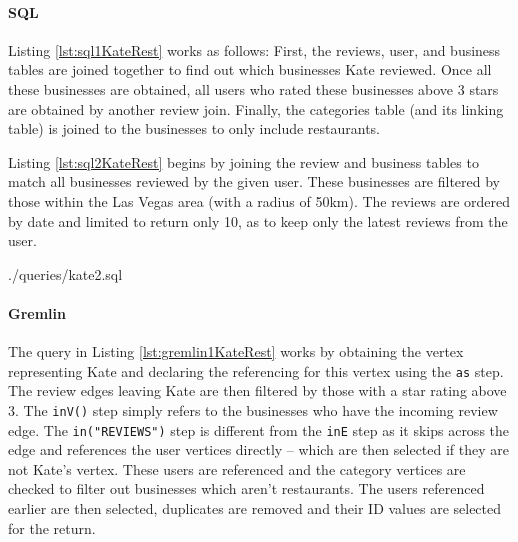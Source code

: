 \paragraph{SQL}

Listing \ref{lst:sql1KateRest} works as follows: First, the reviews, user, and business tables are joined together to find out which businesses Kate reviewed. Once all these businesses are obtained, all users who rated these businesses above 3 stars are obtained by another review join. Finally, the categories table (and its linking table) is joined to the businesses to only include restaurants.



Listing \ref{lst:sql2KateRest} begins by joining the review and business tables to match all businesses reviewed by the given user. These businesses are filtered by those within the Las Vegas area (with a radius of 50km). The reviews are ordered by date and limited to return only 10, as to keep only the latest reviews from the user.


{./queries/kate2.sql}


\paragraph{Gremlin}

The query in Listing \ref{lst:gremlin1KateRest} works by obtaining the vertex representing Kate and declaring the referencing for this vertex using the \texttt{as} step. The review edges leaving Kate are then filtered by those with a star rating above 3. The \texttt{inV()} step simply refers to the businesses who have the incoming review edge. The \texttt{in("REVIEWS")} step is different from the \texttt{inE} step as it skips across the edge and references the user vertices directly -- which are then selected if they are not Kate's vertex. These users are referenced and the category vertices are checked to filter out businesses which aren't restaurants. The users referenced earlier are then selected, duplicates are removed and their ID values are selected for the return.

